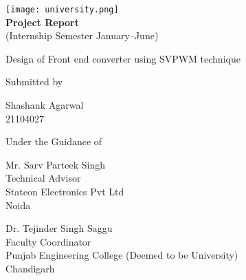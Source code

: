 \begin{titlepage}
    \begin{center}
        \texttt{[image: university.png]}\\
        {\huge\textbf{Project Report}}\\
        \vspace*{0.2cm}
        (Internship Semester January--June)

        \vspace*{3cm}
        {\Large Design of Front end converter using SVPWM technique}

        \vfill
        Submitted by

        \vfill
        Shashank Agarwal\\
        21104027

        \vfill
        Under the Guidance of
    \end{center}
    \vfill

    \noindent
    \begin{minipage}[t]{0.5\textwidth}
        \raggedright
        Mr. Sarv Parteek Singh\\
        Technical Advisor\\
        Statcon Electronics Pvt Ltd\\
        Noida
    \end{minipage}
    \hfill
    \begin{minipage}[t]{0.5\textwidth}
        \raggedleft
        Dr. Tejinder Singh Saggu\\
        Faculty Coordinator\\
        Punjab Engineering College (Deemed to be University)\\
        Chandigarh
    \end{minipage}
\end{titlepage}